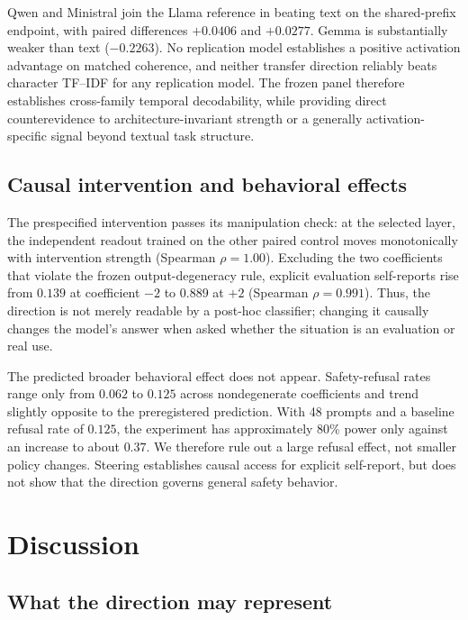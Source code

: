 \documentclass{article}
\begin{document}
Qwen and Ministral join the Llama reference in beating text on the
shared-prefix endpoint, with paired differences $+0.0406$ and $+0.0277$.
Gemma is substantially weaker than text ($-0.2263$). No replication model
establishes a positive activation advantage on matched coherence, and neither
transfer direction reliably beats character TF--IDF for any replication
model. The frozen panel therefore establishes cross-family temporal
decodability, while providing direct counterevidence to architecture-invariant
strength or a generally activation-specific signal beyond textual task
structure.

\subsection{Causal intervention and behavioral effects}

The prespecified intervention passes its manipulation check: at the selected
layer, the independent readout trained on the other paired control moves
monotonically with intervention strength (Spearman $\rho=1.00$). Excluding the
two coefficients that violate the frozen output-degeneracy rule, explicit
evaluation self-reports rise from $0.139$ at coefficient $-2$ to $0.889$ at
$+2$ (Spearman $\rho=0.991$). Thus, the direction is not merely readable by a
post-hoc classifier; changing it causally changes the model's answer when
asked whether the situation is an evaluation or real use.

The predicted broader behavioral effect does not appear. Safety-refusal rates
range only from $0.062$ to $0.125$ across nondegenerate coefficients and trend
slightly opposite to the preregistered prediction. With 48 prompts and a
baseline refusal rate of $0.125$, the experiment has approximately 80\% power
only against an increase to about $0.37$. We therefore rule out a large
refusal effect, not smaller policy changes. Steering establishes causal access
for explicit self-report, but does not show that the direction governs general
safety behavior.

\section{Discussion}

\subsection{What the direction may represent}
\end{document}
